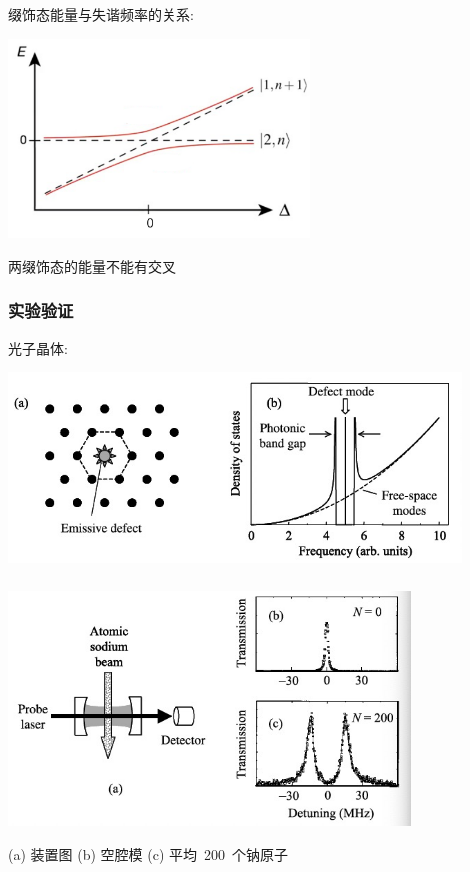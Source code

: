     \begin{frame} 
    \frametitle{}
    缀饰态能量与失谐频率的关系:
      \begin{center}
           \includegraphics[width=0.6\textwidth]{figs/28.png}
      \end{center} 
      两缀饰态的能量不能有交叉
    \end{frame}

    \begin{frame} 
    \frametitle{实验验证}
     光子晶体:
       \begin{center}
            \includegraphics[width=0.9\textwidth]{figs/2022-05-27-21-03-17.png}
       \end{center}       
    \end{frame}

    \begin{frame} 
    \frametitle{}
           \begin{center}
                \includegraphics[width=0.8\textwidth]{figs/2022-05-27-21-07-24.png}
           \end{center}
        (a) 装置图   (b) 空腔模  (c) 平均~200~个钠原子
    \end{frame}
